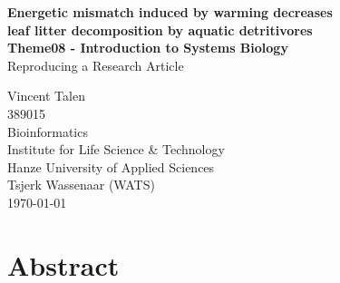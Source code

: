 \newpage
\begin{center}
  \topskip=45pt
  \LARGE{\textbf{Energetic mismatch induced by warming decreases\\leaf litter decomposition by aquatic detritivores}}\\
  \vspace*{20pt}
  \large{\textbf{Theme08 - Introduction to Systems Biology}}\\
  \large{Reproducing a Research Article}\\
\end{center}
\vspace*{\fill}
\begin{flushright}
  Vincent Talen\\
  389015\\
  Bioinformatics\\
  Institute for Life Science \& Technology\\
  Hanze University of Applied Sciences\\
  Tsjerk Wassenaar (WATS)\\
  \today\\
\end{flushright}


\newpage
{}
\section*{Abstract}



\newpage
\setcounter{tocdepth}{3}
\setcounter{secnumdepth}{2}
\renewcommand{\contentsname}{Table of Contents}
\tableofcontents


\newpage

\listoffigures 
\listoftables


\newpage
